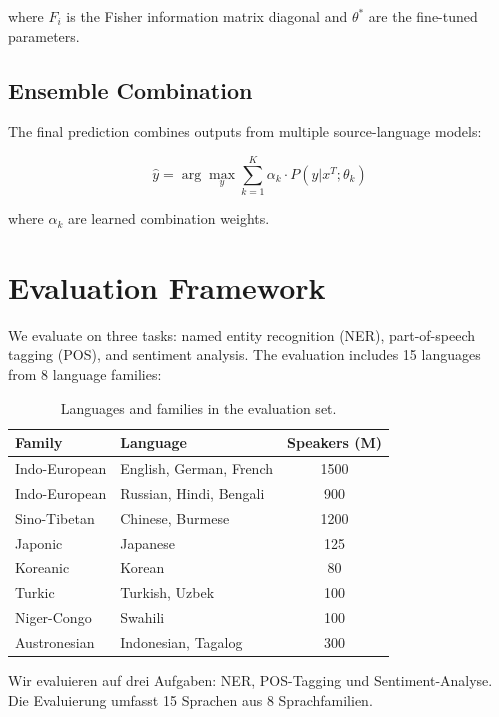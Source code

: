 where $F_i$ is the Fisher information matrix diagonal and
$\theta^*$ are the fine-tuned parameters.

\subsection{Ensemble Combination}

The final prediction combines outputs from multiple source-language
models:

\begin{equation}
    \hat{y} = \arg\max_y \sum_{k=1}^{K} \alpha_k \cdot P(y | x^T; \theta_k)
    \label{eq:ensemble}
\end{equation}

where $\alpha_k$ are learned combination weights.

\section{Evaluation Framework}

We evaluate on three tasks: named entity recognition (NER), part-of-speech
tagging (POS), and sentiment analysis.  The evaluation includes 15
languages from 8 language families:

\begin{table}[htbp]
    \centering
    \caption{Languages and families in the evaluation set.}
    \label{tab:languages}
    \begin{tabular}{@{}llc@{}}
        \toprule
        Family & Language & Speakers (M) \\
        \midrule
        Indo-European & English, German, French & 1500 \\
        Indo-European & Russian, Hindi, Bengali & 900 \\
        Sino-Tibetan & Chinese, Burmese & 1200 \\
        Japonic & Japanese & 125 \\
        Koreanic & Korean & 80 \\
        Turkic & Turkish, Uzbek & 100 \\
        Niger-Congo & Swahili & 100 \\
        Austronesian & Indonesian, Tagalog & 300 \\
        \bottomrule
    \end{tabular}
\end{table}

\foreignlanguage{german}{Wir evaluieren auf drei Aufgaben: NER,
POS-Tagging und Sentiment-Analyse.  Die Evaluierung umfasst 15
Sprachen aus 8 Sprachfamilien.}

